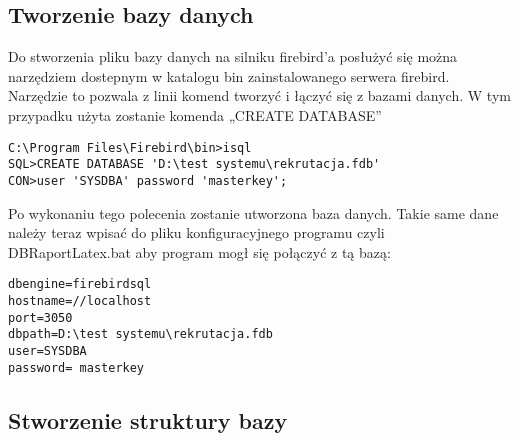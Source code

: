 \subsection{ Tworzenie bazy danych }

Do stworzenia pliku bazy danych na silniku firebird’a posłużyć się można narzędziem dostepnym w katalogu bin zainstalowanego serwera firebird.  Narzędzie to pozwala z linii komend tworzyć i łączyć się z bazami danych. W tym przypadku użyta zostanie komenda „CREATE DATABASE”
\begin{lstlisting}
C:\Program Files\Firebird\bin>isql
SQL>CREATE DATABASE 'D:\test systemu\rekrutacja.fdb'
CON>user 'SYSDBA' password 'masterkey';
\end{lstlisting}
Po wykonaniu tego polecenia zostanie utworzona baza danych. Takie same dane należy teraz wpisać do pliku konfiguracyjnego programu czyli DBRaportLatex.bat aby program mogł się połączyć z tą bazą:
\begin{lstlisting}
dbengine=firebirdsql
hostname=//localhost
port=3050
dbpath=D:\test systemu\rekrutacja.fdb
user=SYSDBA
password= masterkey
\end{lstlisting}
\subsection{ Stworzenie struktury bazy}

